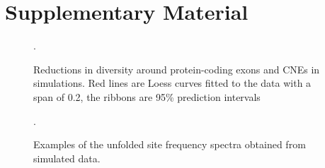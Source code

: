 \section{Supplementary Material}

\linespread{1}








\begin{figure}[H]
   \centering      
   \noindent{}
 \caption{Reductions in diversity around protein-coding exons and CNEs in simulations. Red lines are Loess curves fitted to the data with a span of 0.2, the ribbons are 95\% prediction intervals}.
 
 \label{fig:BGSLoess}
\end{figure}

\begin{figure}[H]
   \centering      
   \noindent{}
 \caption{Examples of the unfolded site frequency spectra obtained from simulated data.}.
 
 \label{fig:SFSexample}
\end{figure}


